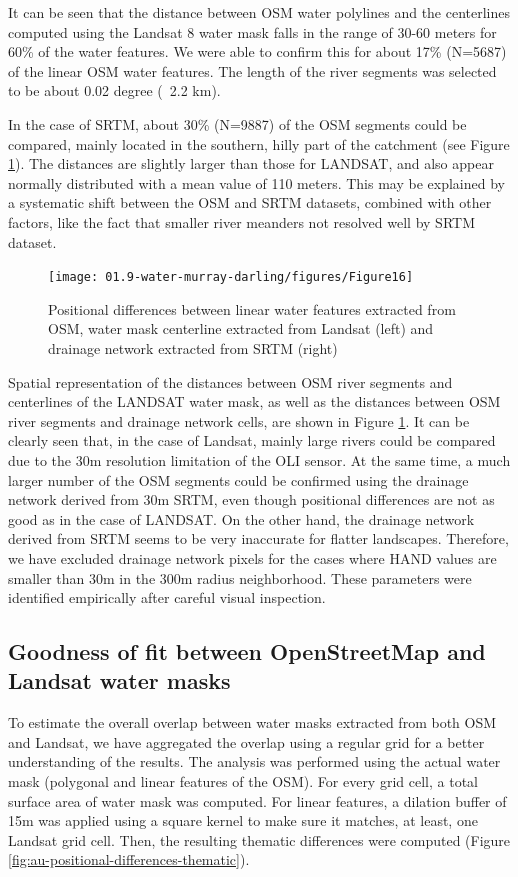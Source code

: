 It can be seen that the distance between OSM water polylines and the centerlines computed using the Landsat 8 water mask falls in the range of 30-60 meters for 60\% of the water features. We were able to confirm this for about 17\% (N=5687) of the linear OSM water features. The length of the river segments was selected to be about 0.02 degree (~2.2 km). 

In the case of SRTM, about 30\% (N=9887) of the OSM segments could be compared, mainly located in the southern, hilly part of the catchment (see Figure \ref{fig:au-positional-differences-map}). The distances are slightly larger than those for LANDSAT, and also appear normally distributed with a mean value of 110 meters. This may be explained by a systematic shift between the OSM and SRTM datasets, combined with other factors, like the fact that smaller river meanders not resolved well by SRTM dataset.

\begin{figure}
	\centering
	\texttt{[image: 01.9-water-murray-darling/figures/Figure16]}
	\caption{Positional differences between linear water features extracted from OSM, water mask centerline extracted from Landsat (left) and drainage network extracted from SRTM (right)}
	\label{fig:au-positional-differences-map}
\end{figure}

Spatial representation of the distances between OSM river segments and centerlines of the LANDSAT water mask, as well as the distances between OSM river segments and drainage network cells, are shown in Figure \ref{fig:au-positional-differences-map}. It can be clearly seen that, in the case of Landsat, mainly large rivers could be compared due to the 30m resolution limitation of the OLI sensor. At the same time, a much larger number of the OSM segments could be confirmed using the drainage network derived from 30m SRTM, even though positional differences are not as good as in the case of LANDSAT. On the other hand, the drainage network derived from SRTM seems to be very inaccurate for flatter landscapes. Therefore, we have excluded drainage network pixels for the cases where HAND values are smaller than 30m in the 300m radius neighborhood. These parameters were identified empirically after careful visual inspection.

\subsection{Goodness of fit between OpenStreetMap and Landsat water masks}
To estimate the overall overlap between water masks extracted from both OSM and Landsat, we have aggregated the overlap using a regular grid for a better understanding of the results. The analysis was performed using the actual water mask (polygonal and linear features of the OSM). For every grid cell, a total surface area of water mask was computed. For linear features, a dilation buffer of 15m was applied using a square kernel to make sure it matches, at least, one Landsat grid cell. Then, the resulting thematic differences were computed (Figure \ref{fig:au-positional-differences-thematic}).

